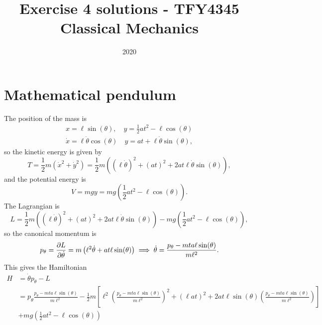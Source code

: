 \documentclass{article}
\title{Exercise 4 solutions - TFY4345 Classical Mechanics}
\date{2020}
\begin{document}
    \maketitle
    \section{Mathematical pendulum}
        The position of the mass is
        \begin{align*}
            x = \ell \sin(\theta), \quad y = \frac{1}{2} a t^2  - \ell \cos(\theta) \\
            \dot x = \ell \dot \theta \cos(\theta) \quad y = a t + \ell \dot \theta \sin(\theta),
        \end{align*}
        so the kinetic energy is given by
        \begin{equation*}
            T = \frac{1}{2}m \left(\dot x^2 + \dot y^2\right) = \frac{1}{2}m \left( (\ell \dot \theta)^2  + (a t)^2 + 2 a t \ell \dot \theta \sin(\theta)\right),
        \end{equation*}
        and the potential energy is 
        \begin{equation*}
            V = mgy = mg \left(\frac{1}{2}a t^2 - \ell \cos(\theta)\right).
        \end{equation*}
        The Lagrangian is
        \begin{equation*}
            L = \frac{1}{2}m \left( (\ell \dot \theta)^2  + (a t)^2 + 2 a t \ell \dot \theta \sin(\theta)\right) - mg \left(\frac{1}{2}a t^2 - \ell \cos(\theta)\right),
        \end{equation*}
        so the canonical momentum is
        \begin{equation*}
            p_\theta = \pdv{L}{\dot \theta} = m\left( \ell^2 \dot \theta + a t \ell\sin(\theta)\right) \implies 
            \dot \theta  = \frac{p_\theta - m t a \ell\sin(\theta)}{m \ell^2}.
        \end{equation*} 
        This gives the Hamiltonian
        \begin{align*}
            H &= \dot \theta p_\theta - L \\
            & = p_\theta \frac{p_\theta - m t a \ell \sin(\theta)}{m \ell^2} - 
            \frac{1}{2}m \left[ \ell^2 \left(\frac{p_\theta - m t a \ell\sin(\theta)}{m \ell^2}\right)^2  + (\ell at)^2 + 2 a t \ell \sin(\theta) \left(\frac{p_\theta - m t a \ell \sin(\theta)}{m \ell^2}\right) \right] \\
            & +  mg \left(\frac{1}{2}a t^2 - \ell \cos(\theta)\right) \\
        \end{align*}
\end{document}
